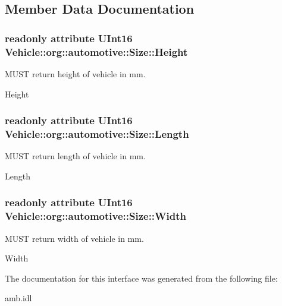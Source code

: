 \subsection{Member Data Documentation}
\hypertarget{interfaceVehicle_1_1org_1_1automotive_1_1Size_a3c8d4195088d50458dc405744e2ba677}{
\subsubsection[{Height}]{\setlength{\rightskip}{0pt plus 5cm}readonly attribute U\-Int16 Vehicle\-::org\-::automotive\-::\-Size\-::\-Height}}\label{interfaceVehicle_1_1org_1_1automotive_1_1Size_a3c8d4195088d50458dc405744e2ba677}


M\-U\-S\-T return height of vehicle in mm. 

Height \hypertarget{interfaceVehicle_1_1org_1_1automotive_1_1Size_a7a8836922871b5b9d6f6d5aac9b9c063}{
\subsubsection[{Length}]{\setlength{\rightskip}{0pt plus 5cm}readonly attribute U\-Int16 Vehicle\-::org\-::automotive\-::\-Size\-::\-Length}}\label{interfaceVehicle_1_1org_1_1automotive_1_1Size_a7a8836922871b5b9d6f6d5aac9b9c063}


M\-U\-S\-T return length of vehicle in mm. 

Length \hypertarget{interfaceVehicle_1_1org_1_1automotive_1_1Size_a467cfdce33a2ff36725d98d075e6e227}{
\subsubsection[{Width}]{\setlength{\rightskip}{0pt plus 5cm}readonly attribute U\-Int16 Vehicle\-::org\-::automotive\-::\-Size\-::\-Width}}\label{interfaceVehicle_1_1org_1_1automotive_1_1Size_a467cfdce33a2ff36725d98d075e6e227}


M\-U\-S\-T return width of vehicle in mm. 

Width 

The documentation for this interface was generated from the following file\-:\begin{DoxyCompactItemize}
\item 
amb.\-idl\end{DoxyCompactItemize}
